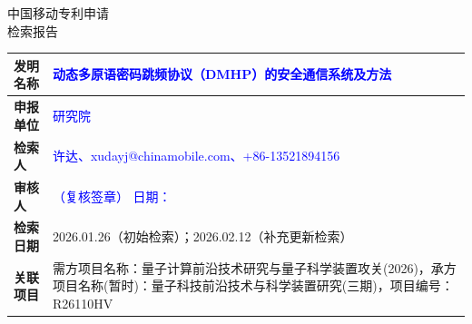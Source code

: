 \documentclass[12pt,a4paper]{article}
\begin{document}
\noindent

\vspace{1em}

\begin{center}
    {\Huge\heiti 中国移动专利申请} \\[0.5em]
    {\Huge\heiti 检索报告} \\[1em]
\end{center}

\begin{table}[h]
    \centering
    
    \begin{tabular}{|p{3cm}|p{12cm}|}
        \hline
        \textbf{发明名称} & \textcolor{blue}{动态多原语密码跳频协议（DMHP）的安全通信系统及方法} \\
        \hline
        \textbf{申报单位} & \textcolor{blue}{研究院} \\
        \hline
        \textbf{检索人} & \textcolor{blue}{许达、xudayj@chinamobile.com、+86-13521894156} \\
        \hline
        \textbf{审核人} & \textcolor{blue}{（复核签章）\hspace{3cm} 日期：\hspace{2cm}} \\
        \hline
        \textbf{检索日期} & 2026.01.26（初始检索）；2026.02.12（补充更新检索） \\
        \hline
        \textbf{关联项目} & 需方项目名称：量子计算前沿技术研究与量子科学装置攻关(2026)，承方项目名称(暂时)：量子科技前沿技术与科学装置研究(三期)，项目编号：R26110HV \\
        \hline
    \end{tabular}
\end{table}

\noindent{}

\vspace{1em}

\end{document}
